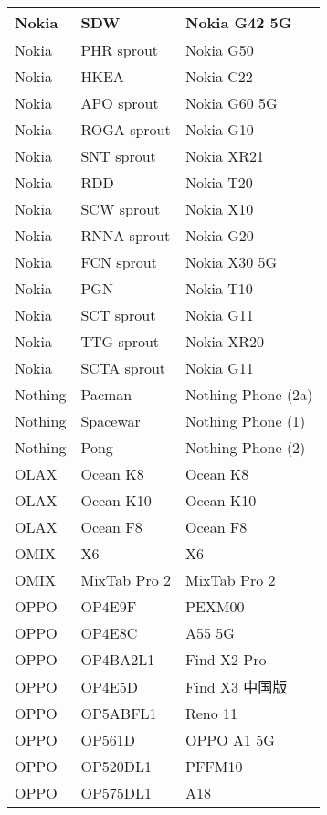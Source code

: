 \begin{tabularx}{\linewidth}{|l|X|X|}
        Nokia & SDW & Nokia G42 5G \\ \hline
        Nokia & PHR sprout & Nokia G50 \\ \hline
        Nokia & HKEA & Nokia C22 \\ \hline
        Nokia & APO sprout & Nokia G60 5G \\ \hline
        Nokia & ROGA sprout & Nokia G10 \\ \hline
        Nokia & SNT sprout & Nokia XR21 \\ \hline
        Nokia & RDD & Nokia T20 \\ \hline
        Nokia & SCW sprout & Nokia X10 \\ \hline
        Nokia & RNNA sprout & Nokia G20 \\ \hline
        Nokia & FCN sprout & Nokia X30 5G \\ \hline
        Nokia & PGN & Nokia T10 \\ \hline
        Nokia & SCT sprout & Nokia G11 \\ \hline
        Nokia & TTG sprout & Nokia XR20 \\ \hline
        Nokia & SCTA sprout & Nokia G11 \\ \hline
        Nothing & Pacman & Nothing Phone (2a) \\ \hline
        Nothing & Spacewar & Nothing Phone (1) \\ \hline
        Nothing & Pong & Nothing Phone (2) \\ \hline
        OLAX & Ocean K8 & Ocean K8 \\ \hline
        OLAX & Ocean K10 & Ocean K10 \\ \hline
        OLAX & Ocean F8 & Ocean F8 \\ \hline
        OMIX & X6 & X6 \\ \hline
        OMIX & MixTab Pro 2 & MixTab Pro 2 \\ \hline
        OPPO & OP4E9F & PEXM00 \\ \hline
        OPPO & OP4E8C & A55 5G \\ \hline
        OPPO & OP4BA2L1 & Find X2 Pro \\ \hline
        OPPO & OP4E5D & Find X3 中国版 \\ \hline
        OPPO & OP5ABFL1 & Reno 11 \\ \hline
        OPPO & OP561D & OPPO A1 5G \\ \hline
        OPPO & OP520DL1 & PFFM10 \\ \hline
        OPPO & OP575DL1 & A18 \\ \hline

\end{tabularx}

